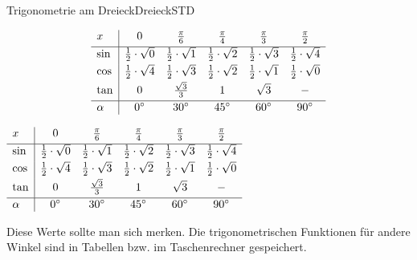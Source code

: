 \begin{MXContent}{Trigonometrie am Dreieck}{Dreieck}{STD}
\ifttm
\begin{MDirectHTML}
\[
\begin{array}[t]{l|*{5}{c}}
 x             & 0                          & \tfrac{\pi}{6}             & \tfrac{\pi}{4}             & \tfrac{\pi}{3}             & \tfrac{\pi}{2}             \\[1mm] \hline
         \sin & \frac{1}{2} \cdot \sqrt{0} & \frac{1}{2} \cdot \sqrt{1} & \frac{1}{2} \cdot \sqrt{2} & \frac{1}{2} \cdot \sqrt{3} & \frac{1}{2} \cdot \sqrt{4} \\[1mm]
         \cos & \frac{1}{2} \cdot \sqrt{4} & \frac{1}{2} \cdot \sqrt{3} & \frac{1}{2} \cdot \sqrt{2} & \frac{1}{2} \cdot \sqrt{1} & \frac{1}{2} \cdot \sqrt{0} \\[1mm]
         \tan & 0                          & \frac{\sqrt{3}}{3}         & 1                          & \sqrt{3}                   & -                          \\[1mm] \hline
 \alpha             & 0^{\circ}                  & 30^{\circ}                 & 45^{\circ}                 & 60^{\circ}                 & 90^{\circ}                
\end{array}
\]
\end{MDirectHTML}
\else
\begin{center}
       $\begin{array}[t]{l|*{5}{c}}
 x             & 0                          & \Mtfrac{\pi}{6}             & \Mtfrac{\pi}{4}             & \Mtfrac{\pi}{3}             & \Mtfrac{\pi}{2}             \\[1mm] \hline
         \sin & \frac{1}{2} \cdot \sqrt{0} & \frac{1}{2} \cdot \sqrt{1} & \frac{1}{2} \cdot \sqrt{2} & \frac{1}{2} \cdot \sqrt{3} & \frac{1}{2} \cdot \sqrt{4} \\[1mm]
         \cos & \frac{1}{2} \cdot \sqrt{4} & \frac{1}{2} \cdot \sqrt{3} & \frac{1}{2} \cdot \sqrt{2} & \frac{1}{2} \cdot \sqrt{1} & \frac{1}{2} \cdot \sqrt{0} \\[1mm]
         \tan & 0                          & \frac{\sqrt{3}}{3}         & 1                          & \sqrt{3}                   & -                          \\[1mm] \hline
 \alpha             & 0^{\circ}                  & 30^{\circ}                 & 45^{\circ}                 & 60^{\circ}                 & 90^{\circ}                
        \end{array}$
\end{center}
\fi

Diese Werte sollte man sich merken. Die trigonometrischen Funktionen f\"ur andere Winkel sind in Tabellen bzw. im Taschenrechner gespeichert.


\end{MXContent}
